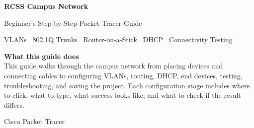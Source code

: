 \documentclass[11pt,a4paper]{article}
\begin{document}
\begin{titlepage}
\centering
\vspace*{20mm}
{\Huge\bfseries RCSS Campus Network\par}
\vspace{5mm}
{\LARGE Beginner's Step-by-Step Packet Tracer Guide\par}
\vspace{12mm}
{\large VLANs \textbullet\ 802.1Q Trunks \textbullet\ Router-on-a-Stick \textbullet\ DHCP \textbullet\ Connectivity Testing\par}
\vfill
\begin{minipage}{0.88\textwidth}
\textbf{What this guide does}\\
This guide walks through the campus network from placing devices and connecting cables to configuring VLANs, routing, DHCP, end devices, testing, troubleshooting, and saving the project. Each configuration stage includes where to click, what to type, what success looks like, and what to check if the result differs.
\end{minipage}
\vfill
{\large Cisco Packet Tracer \par}
\vspace{8mm}
\end{titlepage}

\clearpage
\end{document}
